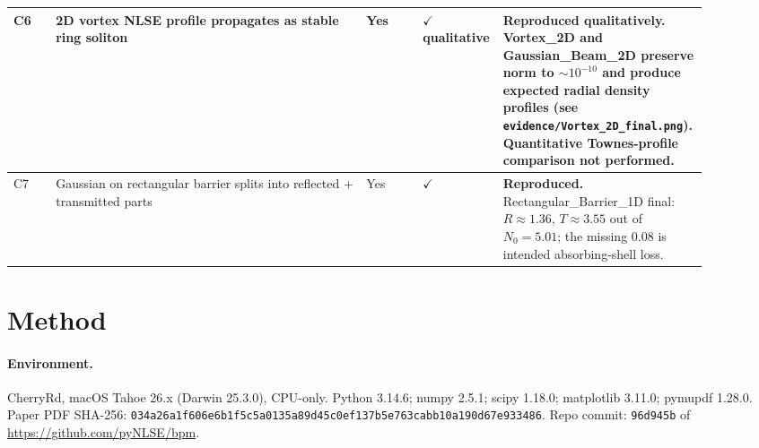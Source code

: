 \documentclass[11pt,a4paper]{article}
\begin{document}
\begin{longtable}{@{}p{0.06\linewidth} p{0.44\linewidth} p{0.08\linewidth}
                    p{0.08\linewidth} p{0.24\linewidth}@{}}
C6 & 2D vortex NLSE profile propagates as stable ring soliton & Yes & $\checkmark$ qualitative &
\textbf{Reproduced qualitatively.} Vortex\_2D and Gaussian\_Beam\_2D preserve norm to $\sim10^{-10}$ and produce expected radial density profiles (see \texttt{evidence/Vortex\_2D\_final.png}). Quantitative Townes-profile comparison not performed. \\
\midrule

C7 & Gaussian on rectangular barrier splits into reflected + transmitted parts & Yes & $\checkmark$ &
\textbf{Reproduced.} Rectangular\_Barrier\_1D final: $R\approx 1.36$, $T\approx 3.55$ out of $N_{0}=5.01$; the missing $0.08$ is intended absorbing-shell loss. \\
\bottomrule
\end{longtable}

\section{Method}
\label{sec:method}

\paragraph{Environment.}
CherryRd, macOS Tahoe 26.x (Darwin 25.3.0), CPU-only.
Python 3.14.6; numpy 2.5.1; scipy 1.18.0; matplotlib 3.11.0; pymupdf 1.28.0.
Paper PDF SHA-256:
\texttt{034a26a1f606e6b1f5c5a0135a89d45c0ef137b5e763cabb10a190d67e933486}.
Repo commit: \texttt{96d945b} of \url{https://github.com/pyNLSE/bpm}.
\end{document}
